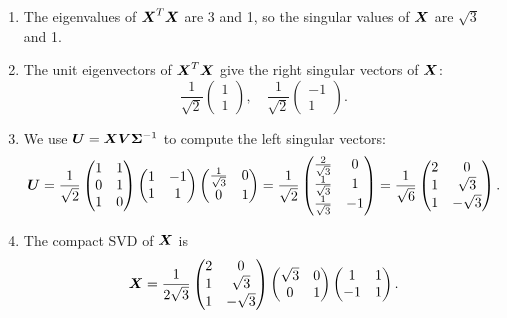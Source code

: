 \documentclass{report}
\newcommand{\Sg}{\mathbf{\Sigma}}
\begin{document}
	\begin{enumerate}
		\item The eigenvalues of $\boldsymbol{X}^T\boldsymbol{X}$ are 3 and 1, so the singular values of $\boldsymbol{X}$ are $\sqrt{3}$ and 1.
		\item The unit eigenvectors of $\boldsymbol{X}^T\boldsymbol{X}$ give the right singular vectors of $\boldsymbol{X}$: 
		$$\frac{1}{\sqrt{2}}\begin{pmatrix}
			1 \\ 1
		\end{pmatrix},\quad \frac{1}{\sqrt{2}}\begin{pmatrix}
		-1 \\ 1
		\end{pmatrix}.$$
		\item We use $\bmU=\bmX\bmV\Sg^{-1}$ to compute the left singular vectors:
		$$\boldsymbol{U}=\frac{1}{\sqrt{2}}\begin{pmatrix}
			1 & 1 \\ 0 & 1 \\ 1 & 0
		\end{pmatrix}\begin{pmatrix}
		1 & -1 \\ 1 & 1
		\end{pmatrix}\begin{pmatrix}
		\frac{1}{\sqrt{3}} & 0 \\ 0 & 1
		\end{pmatrix}=\frac{1}{\sqrt{2}}\begin{pmatrix}
		\frac{2}{\sqrt{3}} & 0 \\ \frac{1}{\sqrt{3}} & 1 \\ \frac{1}{\sqrt{3}} & -1
		\end{pmatrix}=\frac{1}{\sqrt{6}}\begin{pmatrix}
		2 & 0 \\ 1 & \sqrt{3} \\ 1 & -\sqrt{3}
		\end{pmatrix}.$$
		\item The compact SVD of $\boldsymbol{X}$ is
		$$\boldsymbol{X}=\frac{1}{2\sqrt{3}}\begin{pmatrix}
			2 & 0 \\ 1 & \sqrt{3} \\ 1 & -\sqrt{3}
		\end{pmatrix}\begin{pmatrix}
		\sqrt{3} & 0 \\ 0 & 1
		\end{pmatrix}\begin{pmatrix}
		1 & 1 \\ -1 & 1
		\end{pmatrix}.$$

\end{enumerate}
\end{document}
